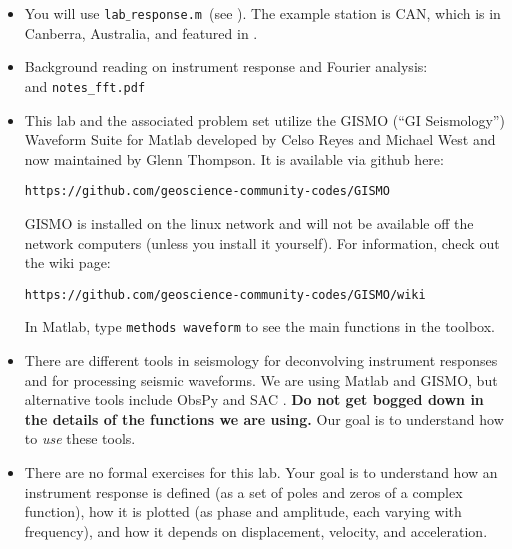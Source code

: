 \documentclass[11pt,titlepage,fleqn]{article}
\newcommand{\tfile}{{\tt lab$\_$response.m}}
\begin{document}
\begin{itemize}

\item You will use \tfile\ (see ). The example station is CAN, which is in Canberra, Australia, and featured in \citet[][Figure~1]{Park2005}.


\item Background reading on instrument response and Fourier analysis: \\ \citet[][Ch.~6]{SteinWysession} and \verb+notes_fft.pdf+


\item This lab and the associated problem set utilize the GISMO (``GI Seismology'') Waveform Suite for Matlab developed by Celso Reyes and Michael West \citep{ReyesWest2011} and now maintained by Glenn Thompson. It is available via github here:

\verb+https://github.com/geoscience-community-codes/GISMO+

GISMO is installed on the linux network and will not be available off the network computers (unless you install it yourself). For information, check out the wiki page:

\verb+https://github.com/geoscience-community-codes/GISMO/wiki+

In Matlab, type \verb+methods waveform+ to see the main functions in the toolbox.


\item There are different tools in seismology for deconvolving instrument responses and for processing seismic waveforms. We are using Matlab and GISMO, but alternative tools include ObsPy \citep{obspy2010} and SAC \citep{SAC}. {\bf Do not get bogged down in the details of the functions we are using.} Our goal is to understand how to {\em use} these tools.


\item There are no formal exercises for this lab. Your goal is to understand how an instrument response is defined (\eg as a set of poles and zeros of a complex function), how it is plotted (\eg as phase and amplitude, each varying with frequency), and how it depends on displacement, velocity, and acceleration.

\end{itemize}

\end{document}
